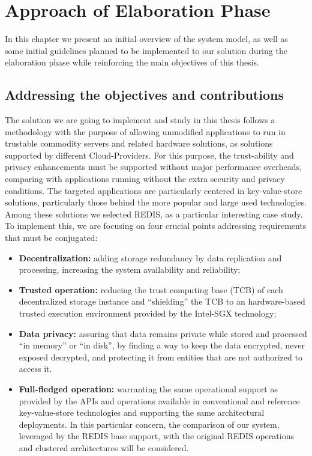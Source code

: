 \chapter{Approach of Elaboration Phase}
\label{cha:approach_of_elaboration_phase}

In this chapter we present an initial overview of the system model, as well as some initial guidelines planned to be implemented to our solution during the elaboration phase while reinforcing the main objectives of this thesis.

\section{Addressing the objectives and contributions} %
\label{sec:document_structure}

The solution we are going to implement and study in this thesis follows a methodology with the purpose of allowing unmodified applications to run in trustable commodity servers and related hardware solutions, as solutions supported by different Cloud-Providers. For this purpose, the trust-ability and privacy enhancements must be supported without major performance overheads, comparing with applications running without the extra security and privacy conditions. The targeted applications are particularly centered in key-value-store solutions, particularly those behind the more popular and large used technologies. Among these solutions we selected REDIS, as a particular interesting case study. To implement this, we are focusing on four crucial points addressing requirements that must be conjugated: 

\begin{itemize}
	\item \textbf{Decentralization:}  adding storage redundancy by data replication and processing, increasing the system availability and reliability; 
	\item \textbf{Trusted operation:}  reducing the trust computing base (TCB) of each decentralized storage instance and “shielding” the TCB to an hardware-based trusted execution environment provided by the Intel-SGX technology;
	\item \textbf{Data privacy:} assuring that data remains private while stored and processed “in memory” or “in disk”, by finding a way to keep the data encrypted, never exposed decrypted, and protecting it from entities that are not authorized to access it. 
	\item \textbf{Full-fledged operation:} warranting the same operational support as provided by the APIs and operations available in conventional and reference key-value-store technologies and supporting the same architectural deployments. In this particular concern, the comparison of our system, leveraged by the REDIS base support, with the original REDIS operations and clustered architectures will be considered.
\end{itemize}




